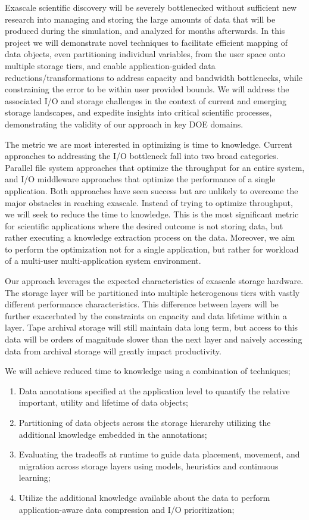 Exascale scientific discovery will be severely bottlenecked without
sufficient new research into managing and storing the large amounts of data
that will be produced during the simulation, and analyzed for months
afterwards.  
%
In this project we will demonstrate novel techniques to
facilitate efficient mapping of data objects, even partitioning individual
variables, from the user space onto multiple storage tiers, and enable
application-guided data reductions/transformations to address capacity and
bandwidth bottlenecks, while constraining the error to be within user
provided bounds.
%
We will address the associated I/O and storage challenges in the context of
current and emerging storage landscapes, and expedite insights into critical
scientific processes, demonstrating the validity of our approach in key DOE
domains. 

The metric we are most interested in optimizing is time to knowledge. Current
approaches to addressing the I/O bottleneck fall into two broad
categories. Parallel file system approaches that optimize the throughput for
an entire system, and I/O middleware approaches that optimize the
performance of a single application. Both approaches have seen success but
are unlikely to overcome the major obstacles in reaching exascale. Instead
of trying to optimize throughput, we will seek to reduce the time to
knowledge. This is the most significant metric for scientific applications
where the desired outcome is not storing data, but rather executing a
knowledge extraction process on the data. Moreover, we aim to perform the
optimization not for a single application, but rather for workload of a
multi-user multi-application system environment.

Our approach leverages the expected characteristics of exascale storage
hardware. The storage layer will be partitioned into multiple heterogenous
tiers with vastly different performance characteristics. This difference
between layers will be further exacerbated by the constraints on capacity
and data lifetime within a layer. Tape archival storage will still maintain
data long term, but access to this data will be orders of magnitude slower
than the next layer and naively accessing data from archival storage will
greatly impact productivity. 

We will achieve reduced time to knowledge using a combination of techniques;
\begin{enumerate}
\item Data annotations specified at the application level to quantify the
  relative important, utility and lifetime of data objects;
\item Partitioning of data objects across the storage hierarchy utilizing
  the additional knowledge embedded in the annotations;
\item Evaluating the tradeoffs at runtime to guide data placement, movement,
  and migration across storage layers using models, heuristics and continuous
  learning;
\item Utilize the additional knowledge available about the data to perform
  application-aware data compression and I/O prioritization;
\end{enumerate}

